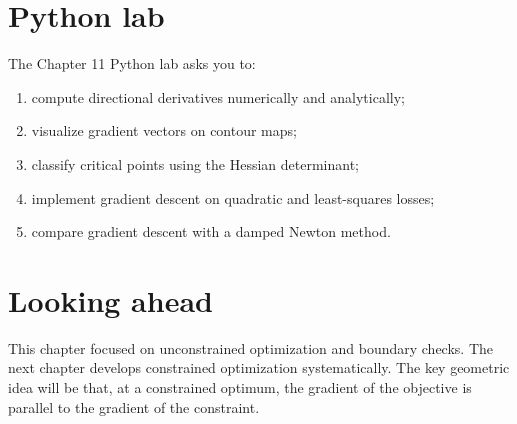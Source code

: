 \documentclass[11pt]{article}
\begin{document}
\section{Python lab}

The Chapter 11 Python lab asks you to:
\begin{enumerate}
  \item compute directional derivatives numerically and analytically;
  \item visualize gradient vectors on contour maps;
  \item classify critical points using the Hessian determinant;
  \item implement gradient descent on quadratic and least-squares losses;
  \item compare gradient descent with a damped Newton method.
\end{enumerate}

\section{Looking ahead}

This chapter focused on unconstrained optimization and boundary checks. The next chapter develops constrained optimization systematically. The key geometric idea will be that, at a constrained optimum, the gradient of the objective is parallel to the gradient of the constraint.
\end{document}
